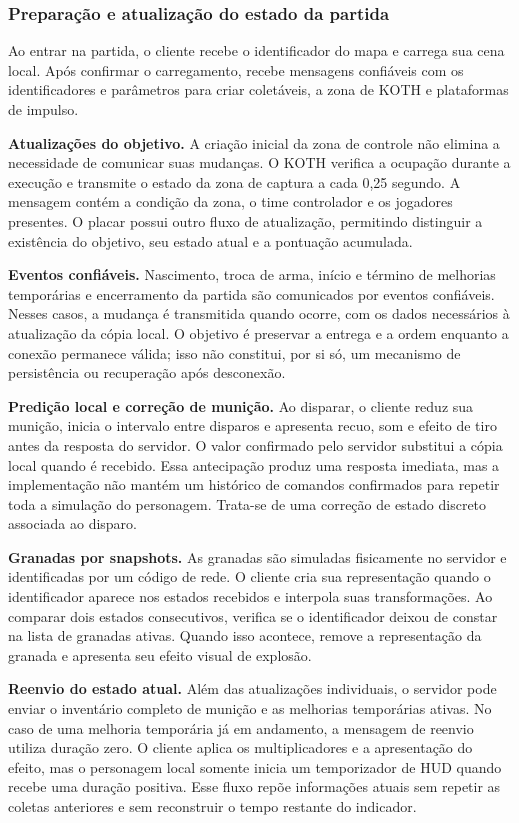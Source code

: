 \subsubsection{Preparação e atualização do estado da partida}

Ao entrar na partida, o cliente recebe o identificador do mapa e carrega sua cena local. Após confirmar o carregamento, recebe mensagens confiáveis com os identificadores e parâmetros para criar coletáveis, a zona de KOTH e plataformas de impulso.

\textbf{Atualizações do objetivo.} A criação inicial da zona de controle não elimina a necessidade de comunicar suas mudanças. O KOTH verifica a ocupação durante a execução e transmite o estado da zona de captura a cada 0,25 segundo. A mensagem contém a condição da zona, o time controlador e os jogadores presentes. O placar possui outro fluxo de atualização, permitindo distinguir a existência do objetivo, seu estado atual e a pontuação acumulada.

\textbf{Eventos confiáveis.} Nascimento, troca de arma, início e término de melhorias temporárias e encerramento da partida são comunicados por eventos confiáveis. Nesses casos, a mudança é transmitida quando ocorre, com os dados necessários à atualização da cópia local. O objetivo é preservar a entrega e a ordem enquanto a conexão permanece válida; isso não constitui, por si só, um mecanismo de persistência ou recuperação após desconexão. \cite{GODOT-PEER}

\textbf{Predição local e correção de munição.} Ao disparar, o cliente reduz sua munição, inicia o intervalo entre disparos e apresenta recuo, som e efeito de tiro antes da resposta do servidor. O valor confirmado pelo servidor substitui a cópia local quando é recebido. Essa antecipação produz uma resposta imediata, mas a implementação não mantém um histórico de comandos confirmados para repetir toda a simulação do personagem. Trata-se de uma correção de estado discreto associada ao disparo.

\textbf{Granadas por snapshots.} As granadas são simuladas fisicamente no servidor e identificadas por um código de rede. O cliente cria sua representação quando o identificador aparece nos estados recebidos e interpola suas transformações. Ao comparar dois estados consecutivos, verifica se o identificador deixou de constar na lista de granadas ativas. Quando isso acontece, remove a representação da granada e apresenta seu efeito visual de explosão.

\textbf{Reenvio do estado atual.} Além das atualizações individuais, o servidor pode enviar o inventário completo de munição e as melhorias temporárias ativas. No caso de uma melhoria temporária já em andamento, a mensagem de reenvio utiliza duração zero. O cliente aplica os multiplicadores e a apresentação do efeito, mas o personagem local somente inicia um temporizador de HUD quando recebe uma duração positiva. Esse fluxo repõe informações atuais sem repetir as coletas anteriores e sem reconstruir o tempo restante do indicador.

